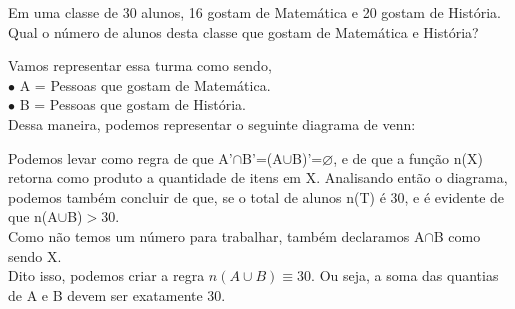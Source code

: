\begin{problem}{}{}
Em uma classe de 30 alunos, 16 gostam de Matemática e 20 gostam de História. Qual o número
de alunos desta classe que gostam de Matemática e História?
\end{problem}

\begin{solution}{}{}
    Vamos representar essa turma como sendo, \\ 
        $\bullet$ A = Pessoas que gostam de Matemática. \\
        $\bullet$ B = Pessoas que gostam de História.   \\

    Dessa maneira, podemos representar o seguinte diagrama de venn: \\
    

    Podemos levar como regra de que A'$\cap$B'=(A$\cup$B)'=$\varnothing$, e de que a função n(X) retorna como produto a quantidade de itens em X.
    Analisando então o diagrama, podemos também concluir de que, se o total de alunos n(T) é 30, e é evidente de que n(A$\cup$B)$>$30. \\

    Como não temos um número para trabalhar, também declaramos A$\cap$B como sendo X. \\
    Dito isso, podemos criar a regra $n(A\cup B) \equiv 30$. Ou seja, a soma das quantias de A e B devem ser exatamente 30. \\
    

\end{solution}
